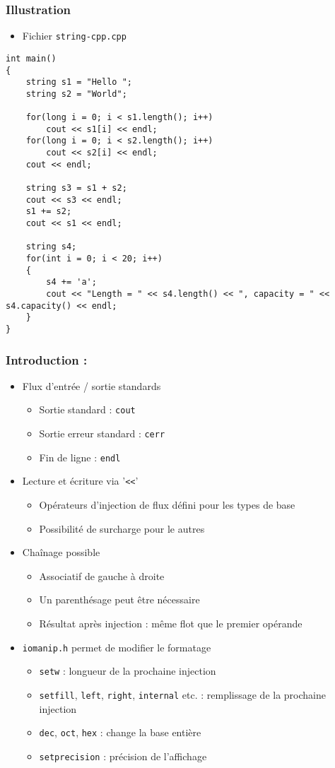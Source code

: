 \begin{frame}[containsverbatim]
\frametitle{Illustration}
\begin{itemize}
\item Fichier \texttt{string-cpp.cpp}
\end{itemize}
\begin{lstlisting}
int main()
{
	string s1 = "Hello ";
	string s2 = "World";

	for(long i = 0; i < s1.length(); i++)
		cout << s1[i] << endl;
	for(long i = 0; i < s2.length(); i++)
		cout << s2[i] << endl;
	cout << endl;

	string s3 = s1 + s2;
	cout << s3 << endl;	
	s1 += s2;
	cout << s1 << endl;

	string s4;
	for(int i = 0; i < 20; i++)
	{
		s4 += 'a';
		cout << "Length = " << s4.length() << ", capacity = " << s4.capacity() << endl;		
	}
}
\end{lstlisting}
\end{frame}

\begin{frame}
\frametitle{Introduction : \cpp}
\begin{itemize}[<+->]
\item Flux d'entrée / sortie standards
	\begin{itemize}
	\item Sortie standard : \texttt{cout} 
	\item Sortie erreur standard : \texttt{cerr}
	\item Fin de ligne : \texttt{endl}
	\end{itemize}
\item Lecture et écriture via '\texttt{<<}'
	\begin{itemize}
	\item Opérateurs d'injection de flux défini pour les types de base
	\item Possibilité de surcharge pour le autres
	\end{itemize}
\item Chaînage possible
	\begin{itemize}
	\item Associatif de gauche à droite
	\item Un parenthésage peut être nécessaire
	\item Résultat après injection : même flot que le premier opérande
	\end{itemize}
\item \texttt{iomanip.h} permet de modifier le formatage
	\begin{itemize}
	\item \texttt{setw} : longueur de la prochaine injection
	\item \texttt{setfill}, \texttt{left}, \texttt{right}, \texttt{internal} etc. : remplissage de la prochaine injection
	\item \texttt{dec}, \texttt{oct}, \texttt{hex} : change la base entière
	\item \texttt{setprecision} : précision de l'affichage
	\end{itemize}
\end{itemize}
\end{frame}

